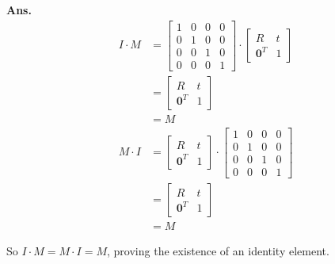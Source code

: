 \documentclass[12pt, a4paper, UTF8, fontset=windows]{ctexbook}
\newenvironment{solution}{\par\noindent\textbf{Ans.}}{\par}
\begin{document}
\begin{solution}
    $$
    \begin{aligned}
    I \cdot M &= \begin{bmatrix}
    1 & 0 & 0 & 0 \\
    0 & 1 & 0 & 0 \\
    0 & 0 & 1 & 0 \\
    0 & 0 & 0 & 1
    \end{bmatrix} \cdot \begin{bmatrix}
    R & t \\
    \mathbf{0}^T & 1
    \end{bmatrix} \\
    &= \begin{bmatrix}
    R & t \\
    \mathbf{0}^T & 1
    \end{bmatrix} \\
    &= M
    \end{aligned}
    $$
    $$
    \begin{aligned}
    M \cdot I &= \begin{bmatrix}
    R & t \\
    \mathbf{0}^T & 1
    \end{bmatrix} \cdot \begin{bmatrix}
    1 & 0 & 0 & 0 \\
    0 & 1 & 0 & 0 \\
    0 & 0 & 1 & 0 \\
    0 & 0 & 0 & 1
    \end{bmatrix} \\
    &= \begin{bmatrix}
    R & t \\
    \mathbf{0}^T & 1
    \end{bmatrix} \\
    &= M
    \end{aligned}
    $$

    So $I \cdot M = M \cdot I = M$, proving the existence of an identity element.


\end{solution}
\end{document}
